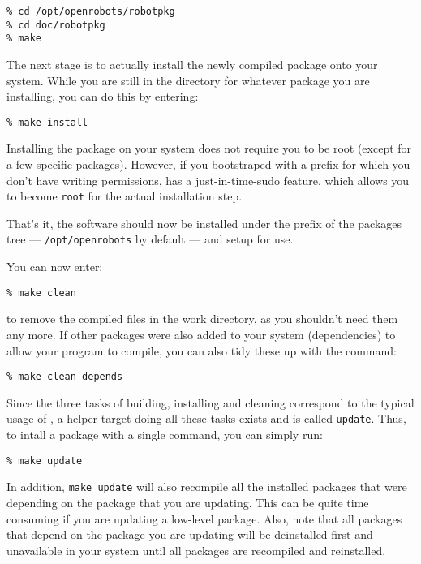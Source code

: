 \begin{verbatim}
% cd /opt/openrobots/robotpkg
% cd doc/robotpkg
% make
\end{verbatim}

The next  stage is  to  actually install the newly   compiled package onto your
system. While you   are still in  the directory  for whatever package  you  are
installing, you can do this by entering:

\begin{verbatim}
% make install
\end{verbatim}

Installing the package on your system does  not require you  to be root (except
for a few specific  packages). However, if   you bootstraped with a  prefix for
which   you  don't   have  writing   permissions,    \robotpkg   has a     {\rm
just-in-time-sudo}  feature,  which allows you to  become  {\tt  root}  for the
actual installation step.

That's it, the software should now be installed   under  the prefix  of the
packages tree --- {\tt /opt/openrobots} by default --- and setup for use.

You can now enter:

\begin{verbatim}
% make clean
\end{verbatim}

to remove the compiled files in the work  directory, as you shouldn't need them
any more. If  other packages were also  added to your system (dependencies)  to
allow your program to compile, you can also tidy these up with the command:

\begin{verbatim}
% make clean-depends
\end{verbatim}

Since  the three tasks of building,  installing and  cleaning correspond to the
typical usage of \robotpkg, a helper target doing all these tasks exists and is
called {\tt update}. Thus,  to intall a package  with a single command, you can
simply run:

\begin{verbatim}
% make update
\end{verbatim}

In addition, {\tt  make update} will  also recompile all the installed packages
that were depending on the package that you are updating. This can be quite
time consuming if you are updating a low-level package. Also, note that all
packages that depend on the package you are updating will be deinstalled
first and unavailable in your system until all packages are recompiled and
reinstalled.

